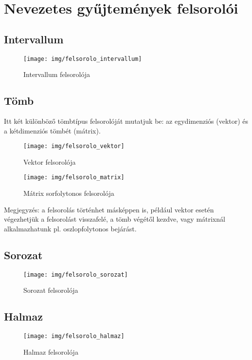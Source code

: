 \documentclass[margin=0px]{article}
\begin{document}


\section{Nevezetes gyűjtemények felsorolói}

\subsection{Intervallum}
\begin{figure}[H]
    \centering
    \texttt{[image: img/felsorolo\_intervallum]}
    \caption{Intervallum felsorolója}
    \label{fig:felsorolo_intervallum}
\end{figure}

\subsection{Tömb}
Itt két különböző tömbtípus felsorolóját mutatjuk be: az egydimenziós (vektor) és a kétdimenziós tömbét (mátrix).

\begin{figure}[H]
    \centering
    \texttt{[image: img/felsorolo\_vektor]}
    \caption{Vektor felsorolója}
    \label{fig:felsorolo_vektor}
\end{figure}

\begin{figure}[H]
    \centering
    \texttt{[image: img/felsorolo\_matrix]}
    \caption{Mátrix sorfolytonos felsorolója}
    \label{fig:felsorolo_matrix}
\end{figure}

Megjegyzés: a felsorolás történhet másképpen is, például vektor esetén végezhetjük a felsorolást visszafelé, a tömb végétől kezdve, vagy mátrixnál alkalmazhatunk pl. oszlopfolytonos bejárást.

\subsection{Sorozat}
\begin{figure}[H]
    \centering
    \texttt{[image: img/felsorolo\_sorozat]}
    \caption{Sorozat felsorolója}
    \label{fig:felsorolo_sorozat}
\end{figure}

\subsection{Halmaz}
\begin{figure}[H]
    \centering
    \texttt{[image: img/felsorolo\_halmaz]}
    \caption{Halmaz felsorolója}
    \label{fig:felsorolo_halmaz}
\end{figure}
\end{document}
